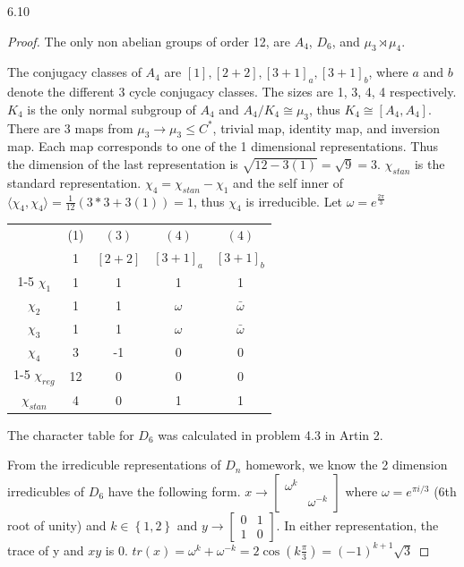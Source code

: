\documentclass{article}
\newcommand{\angles}[1]{\langle #1 \rangle}
\begin{document}
\bigskip

\begin{PROB}{6.10}\label{Problem 6.10.}
\end{PROB}
\begin{proof}
    The only non abelian groups of order 12, are $A_4$, $D_6$, and $\mu_3 \rtimes \mu_4$.

    The conjugacy classes of $A_4$ are $[1], [2 + 2], [3 + 1]_a, [3 + 1]_b$, where $a$ and $b$ denote the different 3 cycle conjugacy classes. The sizes are 1, 3, 4, 4 respectively. $K_4$ is the only normal subgroup of $A_4$ and $A_4 / K_4 \cong \mu_3$, thus $K_4 \cong [A_4, A_4]$. There are 3 maps from $\mu_3 \to \mu_3 \leq C^*$, trivial map, identity map, and inversion map. Each map corresponds to one of the 1 dimensional representations. Thus the dimension of the last representation is $\sqrt{12 - 3(1)} = \sqrt{9} = 3$.           
    $\chi_{stan}$ is the standard representation. $\chi_4 = \chi_{stan} - \chi_{1}$ and the self inner of $\angles{\chi_4, \chi_4} = \frac{1}{12} (3 * 3 + 3(1)) = 1$, thus $\chi_4$ is irreducible. Let $\omega = e^{\frac{2\pi}{3}}$ 
    
    \begin{tabular}{c | c c c c}
        & (1) & $(3)$ & $(4)$ & $(4)$   \\
        & 1 & $[2 + 2]$ & $[3 + 1]_a$ & $[3 + 1]_b$   \\
        \cline{1-5}
        $\chi_1$ & 1 & 1 & 1 & 1 \\
        $\chi_2$ & 1 & 1 & $\omega$ & $\bar{\omega}$ \\
        $\chi_3$ & 1 & 1 & $\omega$ & $\bar{\omega}$ \\
        $\chi_4$ & 3 & -1 & 0 & 0 \\
        \cline{1-5}
        $\chi_{reg}$ & 12 & 0 & 0 & 0 \\
        $\chi_{stan}$ & 4 & 0 & 1 & 1
    \end{tabular}

    \bigskip


    The character table for $D_6$ was calculated in problem 4.3 in Artin 2. 
    
    From the irredicuble representations of $D_n$ homework, we know the 2 dimension irredicubles of $D_6$ have the following form. $x \to \begin{bmatrix}
        \omega^k \\ & \omega^{-k}
    \end{bmatrix}$ where $\omega = e^{\pi i / 3}$ (6th root of unity) and $k \in \left\{1, 2 \right\}$ and $y \to \begin{bmatrix}
        0 & 1 \\ 1 & 0
    \end{bmatrix}$. In either representation, the trace of y and $xy$  is 0. $tr(x) = \omega^{k} + \omega^{-k} = 2\cos(k\frac{\pi}{3}) = (-1)^{k + 1} \sqrt{3}$  
    

\end{proof}
\end{document}
